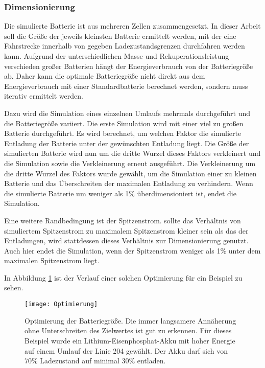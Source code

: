 \subsubsection{Dimensionierung}

Die simulierte Batterie ist aus mehreren Zellen zusammengesetzt. In dieser Arbeit soll die Größe der jeweils kleinsten Batterie ermittelt werden, mit der eine Fahrstrecke innerhalb von gegeben Ladezustandsgrenzen durchfahren werden kann. Aufgrund der unterschiedlichen Masse und Rekuperationsleistung verschieden großer Batterien hängt der Energieverbrauch von der Batteriegröße ab. Daher kann die optimale Batteriegröße nicht direkt aus dem Energieverbrauch mit einer Standardbatterie berechnet werden, sondern muss iterativ ermittelt werden.

Dazu wird die Simulation eines einzelnen Umlaufs mehrmals durchgeführt und die Batteriegröße variiert. Die erste Simulation wird mit einer viel zu großen Batterie durchgeführt. Es wird berechnet, um welchen Faktor die simulierte Entladung der Batterie unter der gewünschten Entladung liegt. Die Größe der simulierten Batterie wird nun um die dritte Wurzel dieses Faktors verkleinert und die Simulation sowie die Verkleinerung erneut ausgeführt. Die Verkleinerung um die dritte Wurzel des Faktors wurde gewählt, um die Simulation einer zu kleinen Batterie und das Überschreiten der maximalen Entladung zu verhindern. Wenn die simulierte Batterie um weniger als 1\% überdimensioniert ist, endet die Simulation.

Eine weitere Randbedingung ist der Spitzenstrom. sollte das Verhältnis von simuliertem Spitzenstrom zu maximalem Spitzenstrom kleiner sein als das der Entladungen, wird stattdessen dieses Verhältnis zur Dimensionierung genutzt. Auch hier endet die Simulation, wenn der Spitzenstrom weniger als 1\% unter dem maximalen Spitzenstrom liegt.

In Abbildung \ref{abb_Optimierung} ist der Verlauf einer solchen Optimierung für ein Beispiel zu sehen.

\begin{figure}\centering
	\texttt{[image: Optimierung]}
	\caption[Optimierung der Batteriegröße]{Optimierung der Batteriegröße. Die immer langsamere Annäherung ohne Unterschreiten des Zielwertes ist gut zu erkennen. Für dieses Beispiel wurde ein Lithium-Eisenphosphat-Akku mit hoher Energie auf einem Umlauf der Linie 204 gewählt. Der Akku darf sich von 70\% Ladezustand auf minimal 30\% entladen.}
	\label{abb_Optimierung}
\end{figure}

